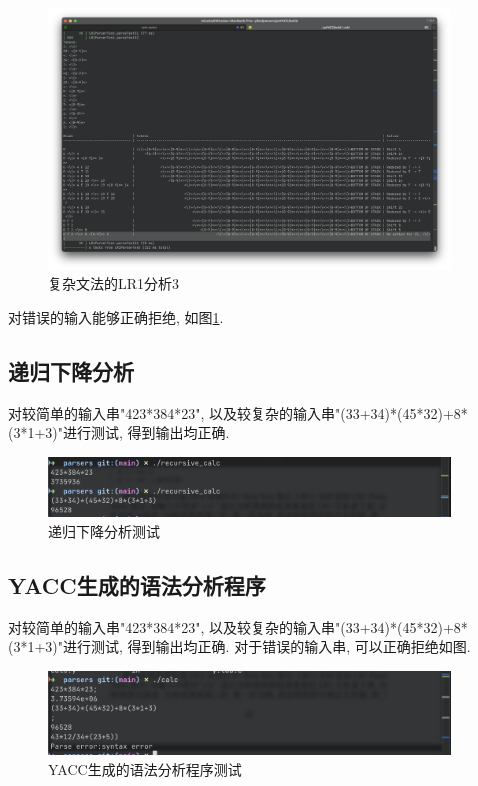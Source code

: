 \begin{figure}[ht!]
	\begin{center}
		\includegraphics[width=0.95\textwidth]{figures/lr1复杂分析3.png}
	\end{center}
	\caption{复杂文法的LR1分析3}
	\label{fig:复杂文法的LR1分析3}
\end{figure}

对错误的输入能够正确拒绝, 如图\ref{fig:复杂文法的LR1分析3}.

\subsection{递归下降分析}
对较简单的输入串"423*384*23",
以及较复杂的输入串"(33+34)*(45*32)+8*(3*1+3)"进行测试, 得到输出均正确.

\begin{figure}[ht!]
	\begin{center}
		\includegraphics[width=0.95\textwidth]{figures/recursive_analysis.png}
	\end{center}
	\caption{递归下降分析测试}
	\label{fig:递归下降分析测试}
\end{figure}

\subsection{YACC生成的语法分析程序}

对较简单的输入串"423*384*23",
以及较复杂的输入串"(33+34)*(45*32)+8*(3*1+3)"进行测试, 得到输出均正确.
对于错误的输入串, 可以正确拒绝如图.

\begin{figure}[ht!]
	\begin{center}
		\includegraphics[width=0.95\textwidth]{figures/yacc_analysis.png}
	\end{center}
	\caption{YACC生成的语法分析程序测试}
	\label{fig:YACC生成的语法分析程序测试}
\end{figure}
